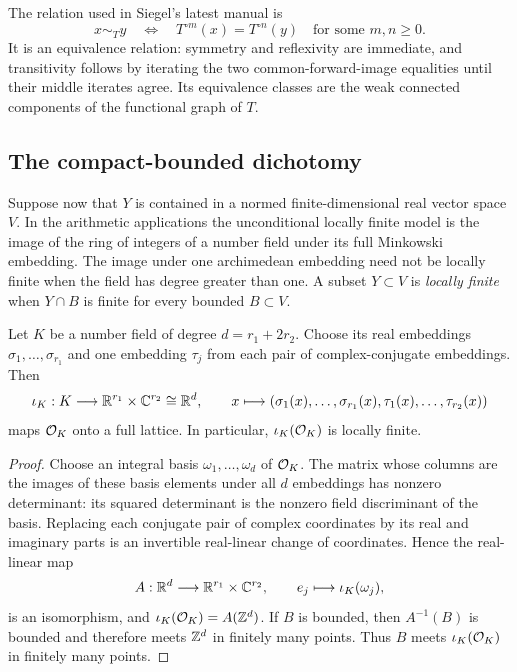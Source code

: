 The relation used in Siegel's latest manual is
\[
 x\sim_T y
 \quad\Longleftrightarrow\quad
 T^{\circ m}(x)=T^{\circ n}(y)
 \quad\text{for some }m,n\geq0.
\]
It is an equivalence relation: symmetry and reflexivity are immediate, and
transitivity follows by iterating the two common-forward-image equalities
until their middle iterates agree.  Its equivalence classes are the weak
connected components of the functional graph of $T$.

\subsection{The compact-bounded dichotomy}

Suppose now that $Y$ is contained in a normed finite-dimensional real vector
space $V$.  In the arithmetic applications the unconditional locally finite
model is the image of the ring of integers of a number field under its full
Minkowski embedding.  The image under one archimedean embedding need not be
locally finite when the field has degree greater than one.  A subset
$Y\subset V$ is \emph{locally finite} when
$Y\cap B$ is finite for every bounded $B\subset V$.

\begin{proposition}
\label{prop:minkowski-lattice}
Let $K$ be a number field of degree $d=r_1+2r_2$.  Choose its real
embeddings $\sigma_1,\ldots,\sigma_{r_1}$ and one embedding
$\tau_j$ from each pair of complex-conjugate embeddings.  Then
\[
 \iota_K:K\longrightarrow\mathbb R^{r_1}\times\mathbb C^{r_2}\cong\mathbb R^d,
 \qquad
 x\longmapsto
 (\sigma_1(x),\ldots,\sigma_{r_1}(x),
  \tau_1(x),\ldots,\tau_{r_2}(x))
\]
maps $\mathcal O_K$ onto a full lattice.  In particular, $\iota_K(\mathcal O_K)$ is locally
finite.
\end{proposition}

\begin{proof}
Choose an integral basis $\omega_1,\ldots,\omega_d$ of $\mathcal O_K$.  The matrix
whose columns are the images of these basis elements under all $d$
embeddings has nonzero determinant: its squared determinant is the nonzero
field discriminant of the basis.  Replacing each conjugate pair of complex
coordinates by its real and imaginary parts is an invertible real-linear
change of coordinates.  Hence the real-linear map
\[
 A:\mathbb R^d\longrightarrow\mathbb R^{r_1}\times\mathbb C^{r_2},
 \qquad e_j\longmapsto\iota_K(\omega_j),
\]
is an isomorphism, and
$\iota_K(\mathcal O_K)=A(\mathbb Z^d)$.  If $B$ is bounded, then $A^{-1}(B)$ is bounded and
therefore meets $\mathbb Z^d$ in finitely many points.  Thus $B$ meets
$\iota_K(\mathcal O_K)$ in finitely many points.
\end{proof}


